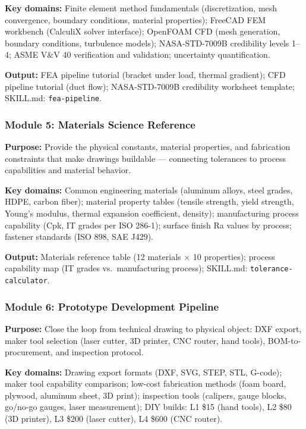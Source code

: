 \documentclass[11pt,letterpaper]{article}
\begin{document}
\textbf{Key domains:} Finite element method fundamentals (discretization, mesh convergence, boundary conditions, material properties); FreeCAD FEM workbench (CalculiX solver interface); OpenFOAM CFD (mesh generation, boundary conditions, turbulence models); NASA-STD-7009B credibility levels 1--4; ASME V\&V 40 verification and validation; uncertainty quantification.

\textbf{Output:} FEA pipeline tutorial (bracket under load, thermal gradient); CFD pipeline tutorial (duct flow); NASA-STD-7009B credibility worksheet template; SKILL.md: \texttt{fea-pipeline}.

\subsubsection{Module 5: Materials Science Reference}
\textbf{Purpose:} Provide the physical constants, material properties, and fabrication constraints that make drawings buildable --- connecting tolerances to process capabilities and material behavior.

\textbf{Key domains:} Common engineering materials (aluminum alloys, steel grades, HDPE, carbon fiber); material property tables (tensile strength, yield strength, Young's modulus, thermal expansion coefficient, density); manufacturing process capability (Cpk, IT grades per ISO 286-1); surface finish Ra values by process; fastener standards (ISO 898, SAE J429).

\textbf{Output:} Materials reference table (12 materials $\times$ 10 properties); process capability map (IT grades vs.\ manufacturing process); SKILL.md: \texttt{tolerance-calculator}.

\subsubsection{Module 6: Prototype Development Pipeline}
\textbf{Purpose:} Close the loop from technical drawing to physical object: DXF export, maker tool selection (laser cutter, 3D printer, CNC router, hand tools), BOM-to-procurement, and inspection protocol.

\textbf{Key domains:} Drawing export formats (DXF, SVG, STEP, STL, G-code); maker tool capability comparison; low-cost fabrication methods (foam board, plywood, aluminum sheet, 3D print); inspection tools (calipers, gauge blocks, go/no-go gauges, laser measurement); DIY builds: L1 \$15 (hand tools), L2 \$80 (3D printer), L3 \$200 (laser cutter), L4 \$600 (CNC router).
\end{document}
